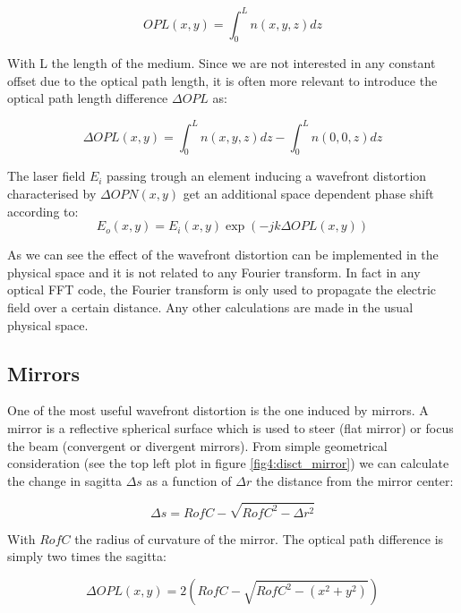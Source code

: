 \begin{equation}
OPL(x,y) = \int_0^L n(x,y,z) dz
\end{equation}

With L the length of the medium. Since we are not interested in any constant offset due to the optical path length, it is often more relevant to introduce the optical path length difference $\Delta OPL$ as:

\begin{equation}
\Delta OPL(x,y) = \int_0^L n(x,y,z) dz - \int_0^L n(0,0,z) dz
\end{equation}

The laser field $E_i$ passing trough an element inducing a wavefront distortion characterised by $\Delta OPN(x,y)$ get an additional space dependent phase shift according to:
\begin{equation}
E_o(x,y) = E_i(x,y) \exp{(-j k \Delta OPL(x,y))}
\label{eq1:mir_ref}
\end{equation}

As we can see the effect of the wavefront distortion can be implemented in the physical space and it is not related to any Fourier transform. In fact in any optical FFT code, the Fourier transform is only used to propagate the electric field  over a certain distance. Any other calculations are made in the usual physical space.

\subsection{Mirrors}
\label{sec1:3:2}

One of the most useful wavefront distortion is the one induced by mirrors. A mirror is a reflective spherical surface which is used to steer (flat mirror) or focus the beam (convergent or divergent mirrors). From simple geometrical consideration (see the top left plot in figure \ref{fig4:disct_mirror}) we can calculate the change in sagitta $\Delta s$ as a function of $ \Delta r$ the distance from the mirror center:

\begin{equation}
\Delta s = RofC - \sqrt{RofC^2 - \Delta r^2}
\end{equation}

With $RofC$ the radius of curvature of the mirror. The optical path difference is simply two times the sagitta:

\begin{equation}
\Delta OPL(x,y) = 2\left(RofC - \sqrt{RofC^2 - (x^2+y^2)}\right)
\label{eq1:mir_ref_OPN}
\end{equation}



